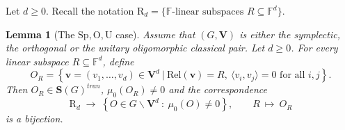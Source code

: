 \documentclass[11pt,a4paper]{amsart}
\theoremstyle{plain}%
\newtheorem{lemma}{Lemma}[subsection]
\theoremstyle{definition}
\theoremstyle{remark}
\newcommand{\V}{\mathbf{V}}
\newcommand{\F}{{\mathbb F}}
\newcommand{\Rel}{\mathrm{Rel}}
\newcommand{\Set}[1]{\mathbf{S}(#1)}
\begin{document}
Let $d\geq 0$. Recall the notation $\mathrm{R}_d= \{\F\text{-linear subspaces } R\subseteq \F^{d}\}$.


\begin{lemma}[The $\mathrm{Sp, O, U}$ case] \label{lem:rank-zero-orbits-formed}
Assume that $(G, \V)$ is either the symplectic, the orthogonal or the unitary oligomorphic classical pair.  
Let $d\geq 0$. For every linear subspace $R\subseteq \F^d$, define
\begin{equation}\label{eq:OR-explicit}
 O_R=
 \left\{
 \mathbf v=(v_1,\ldots,v_d)\in\mathbf V^d \ | \
 \Rel(\mathbf v)=R,
 \ \langle v_i,v_j\rangle=0\text{ for all }i,j
 \right\}.
\end{equation}
Then $O_R \in \Set{G}^{tran}$, ${\mu_0}(O_R)\neq 0$ and the correspondence
$$ \mathrm{R}_{d}\;\longrightarrow\;\left\{O\in G\backslash \V^{d} ~:~\mu_0(O)\neq 0\right\}, \qquad R~\longmapsto ~O_R$$
is a bijection.

\end{lemma}
\end{document}
